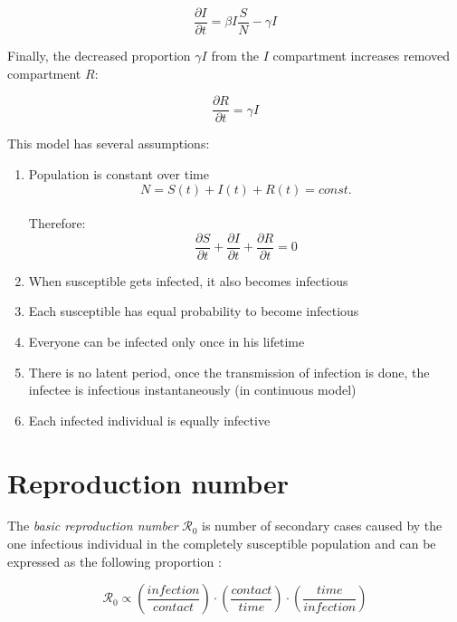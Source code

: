 \documentclass[
  digital, %
  oneside, %
  lof,     %
  lot,     %
]{fithesis4}
\begin{document}
\begin{equation}\label{eq:sir-model-partial-I}
	\frac{\partial{I}}{\partial{t}} = \beta I \frac{S}{N} - \gamma I
\end{equation}

Finally, the decreased proportion $\gamma I$ from the 
$I$ compartment increases removed compartment $R$:

\begin{equation}
	\frac{\partial{R}}{\partial{t}} = \gamma I
\end{equation}

This model has several assumptions:

\begin{enumerate}
  \item Population is constant over time \\
    \begin{equation}
      N = S(t) + I(t) + R(t) = const.
    \end{equation} \\
    Therefore: \\
    \begin{equation}
      \frac{\partial{S}}{\partial{t}} + \frac{\partial{I}}{\partial{t}} + \frac{\partial{R}}{\partial{t}} = 0
    \end{equation}
  \item When susceptible gets infected, it also becomes infectious
  \item Each susceptible has equal probability to become infectious
  \item Everyone can be infected only once in his lifetime
  \item There is no latent period, once the transmission of infection is done, the infectee is infectious instantaneously (in continuous model)
  \item Each infected individual is equally infective \cite{volz2018}
\end{enumerate}


\section{Reproduction number}

The \textit{basic reproduction number} $\mathcal{R}_0$ is number 
of secondary cases caused by the one infectious individual 
in the completely susceptible population and can be expressed
as the following proportion \cite{jones2007}:

\begin{equation}
	\mathcal{R}_0 \propto \left(\frac{infection}{contact}\right)\cdot\left(\frac{contact}{time}\right)\cdot\left(\frac{time}{infection}\right)  
\end{equation}
\end{document}
